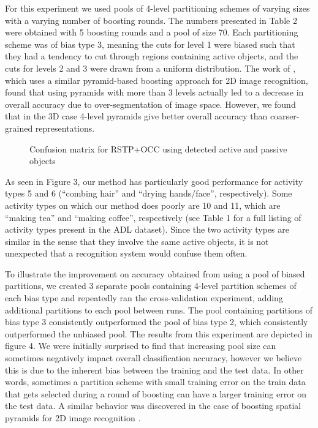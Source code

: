 \documentclass{bmvc2k}
\begin{document}
  For this experiment we used pools of 4-level partitioning schemes of
  varying sizes with a varying number of boosting rounds. The numbers
  presented in Table 2 were obtained with 5 boosting rounds and a pool of
  size 70.
  Each partitioning scheme was of bias type 3, meaning the cuts for level 1
  were biased such that they had a tendency to cut through regions containing
  active objects, and the cuts for levels 2 and 3 were drawn from a uniform
  distribution. The work of \cite{Jiang12}, which uses a similar
  pyramid-based boosting approach for 2D image recognition, found that using
  pyramids with more than 3 levels actually led to a decrease in overall
  accuracy due to over-segmentation of image space. However, we found that in the
  3D case 4-level pyramids give better overall accuracy than coarser-grained
  representations.
	
  \begin{figure}
  \begin{center}
		   \caption{Confusion matrix for RSTP+OCC using detected active and
       passive objects}
  \label{fig:teaser}
  \end{center}
  \end{figure}
	As seen in Figure 3, our method has particularly good
  performance for activity types 5 and 6 (``combing hair'' and ``drying
  hands/face'', respectively). Some activity types on which our method does
  poorly are 10 and 11, which are ``making tea'' and ``making coffee'',
  respectively (see Table 1 for a full listing of activity types present in
  the ADL dataset). Since the two activity types are similar in the sense that
  they involve the same active objects, it is not
  unexpected that a recognition system would confuse them often.
  
  To illustrate the improvement on accuracy obtained from using a pool of
  biased partitions, we created 3 separate pools containing 4-level
  partition schemes of each bias type and
  repeatedly ran the cross-validation experiment, adding additional
  partitions to each pool between runs. The pool containing partitions of
  bias type 3 consistently outperformed the pool of bias type 2, which
  consistently outperformed the unbiased pool. The
  results from this experiment are depicted in figure 4. We were initially
  surprised to find that increasing pool size can
  sometimes negatively impact overall classification accuracy, however we
  believe this is due to the inherent bias between the training and the test
  data. In other words, sometimes a partition scheme with small training error
  on the train data that gets selected during a round of boosting can have a
  larger training error on the test data. A similar behavior was discovered
  in the case of boosting spatial pyramids for 2D image recognition
  \cite{Jiang12}.
 
\end{document}
